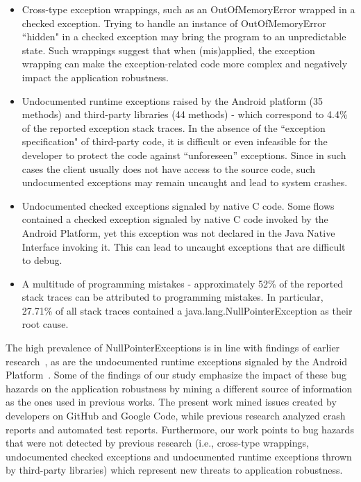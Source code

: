 \documentclass[conference]{IEEEtran}
\begin{document}
\begin{itemize}

   \item  Cross-type exception wrappings, such as an OutOfMemoryError wrapped in a checked exception.
Trying to handle an instance of OutOfMemoryError ``hidden" in  a checked exception may bring the program
 to an unpredictable state. Such wrappings suggest that when (mis)applied, the exception wrapping can make 
the exception-related code more complex and negatively impact the application robustness.

  \item  Undocumented runtime exceptions raised by the Android platform (35 methods) and  third-party libraries (44 methods) -
 which correspond to 4.4\% of the reported exception stack traces.
In the absence of the ``exception specification" of third-party code, it is difficult or 
even infeasible for the developer to protect the code against ``unforeseen'' exceptions. 
Since in such cases the client usually does not have access to the source code, such undocumented 
exceptions may remain uncaught and lead to system crashes. 

   \item Undocumented checked exceptions signaled by native C code.  Some flows contained a checked 
exception signaled by native C code invoked by the Android Platform, yet this exception was not declared
 in the Java Native Interface invoking it. This can lead to uncaught exceptions that are 
difficult to debug. 

 \item A multitude of programming mistakes - approximately 52\% of the reported stack traces can 
be attributed to programming mistakes. In particular, 27.71\% of all stack traces contained a java.lang.NullPointerException 
as their root cause.

\end{itemize}

 The high prevalence of NullPointerExceptions is in line with findings of earlier research~\cite{kim2013predicting,fraser20131600,csallner2004jcrasher}, as are the undocumented runtime 
exceptions signaled by the Android Platform~\cite{kechagia2014}. 
Some of the findings of our
 study emphasize the impact of these bug hazards on the application robustness 
by mining a different source of information as the ones used in previous works. The present work 
mined issues created by developers on GitHub and Google Code, while  previous research analyzed crash reports and automated test reports.
 Furthermore, our work points to bug hazards that were not detected by previous research (i.e., cross-type wrappings, undocumented checked exceptions and undocumented runtime exceptions thrown by third-party libraries) which represent new threats to application robustness.
\end{document}
